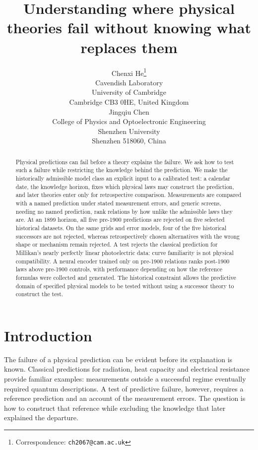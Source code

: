 \documentclass{article}
\title{Understanding where physical theories fail without knowing what replaces them}
\author{%
  Chenxi He\thanks{Correspondence: \texttt{ch2067@cam.ac.uk}} \\
  Cavendish Laboratory\\
  University of Cambridge\\
  Cambridge CB3 0HE, United Kingdom \\
  \And
  Jingqiu Chen \\
  College of Physics and Optoelectronic Engineering\\
  Shenzhen University\\
  Shenzhen 518060, China \\
}
\begin{document}
\maketitle
\linenumbers

\begin{abstract}
Physical predictions can fail before a theory explains the failure. We ask how to test such a failure while restricting the knowledge behind the prediction. We make the historically admissible model class an explicit input to a calibrated test: a calendar date, the knowledge horizon, fixes which physical laws may construct the prediction, and later theories enter only for retrospective comparison. Measurements are compared with a named prediction under stated measurement errors, and generic screens, needing no named prediction, rank relations by how unlike the admissible laws they are. At an 1899 horizon, all five pre-1900 predictions are rejected on five selected historical datasets. On the same grids and error models, four of the five historical successors are not rejected, whereas retrospectively chosen alternatives with the wrong shape or mechanism remain rejected. A test rejects the classical prediction for Millikan's nearly perfectly linear photoelectric data: curve familiarity is not physical compatibility. A neural encoder trained only on pre-1900 relations ranks post-1900 laws above pre-1900 controls, with performance depending on how the reference formulas were collected and generated. The historical constraint allows the predictive domain of specified physical models to be tested without using a successor theory to construct the test.

\end{abstract}

\section{Introduction}

The failure of a physical prediction can be evident before its explanation is known. Classical predictions for radiation, heat capacity and electrical resistance provide familiar examples: measurements outside a successful regime eventually required quantum descriptions. A test of predictive failure, however, requires a reference prediction and an account of the measurement errors. The question is how to construct that reference while excluding the knowledge that later explained the departure.
\end{document}

